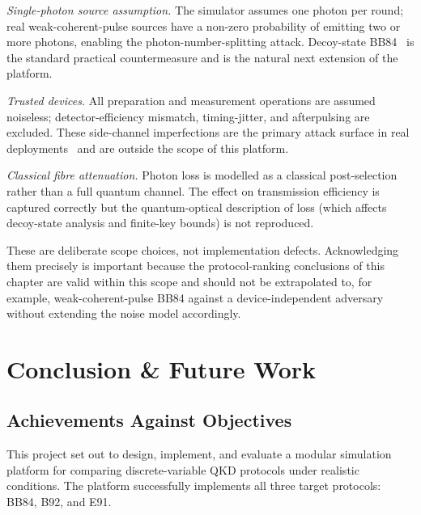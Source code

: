 \documentclass[10pt, a4paper]{report}
\begin{document}
\textit{Single-photon source assumption.} The simulator assumes one photon per round; real weak-coherent-pulse sources have a non-zero probability of emitting two or more photons, enabling the photon-number-splitting attack. Decoy-state BB84~\cite{Lo2005Decoy, Ma2005} is the standard practical countermeasure and is the natural next extension of the platform.

\textit{Trusted devices.} All preparation and measurement operations are assumed noiseless; detector-efficiency mismatch, timing-jitter, and afterpulsing are excluded. These side-channel imperfections are the primary attack surface in real deployments~\cite{Scarani2009} and are outside the scope of this platform.

\textit{Classical fibre attenuation.} Photon loss is modelled as a classical post-selection rather than a full quantum channel. The effect on transmission efficiency is captured correctly but the quantum-optical description of loss (which affects decoy-state analysis and finite-key bounds) is not reproduced.

These are deliberate scope choices, not implementation defects. Acknowledging them precisely is important because the protocol-ranking conclusions of this chapter are valid within this scope and should not be extrapolated to, for example, weak-coherent-pulse BB84 against a device-independent adversary without extending the noise model accordingly.



\chapter{Conclusion \& Future Work}


\section{Achievements Against Objectives}

This project set out to design, implement, and evaluate a modular simulation platform for comparing discrete-variable QKD protocols under realistic conditions. The platform successfully implements all three target protocols: BB84, B92, and E91.
\end{document}
